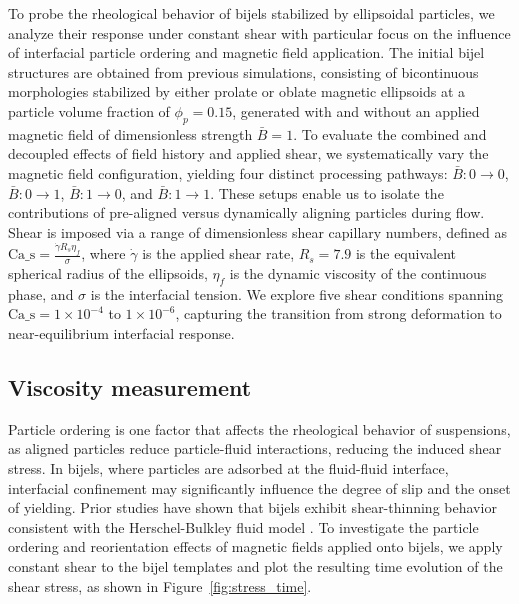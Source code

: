 To probe the rheological behavior of bijels stabilized by ellipsoidal particles, we analyze their response under constant shear with particular focus on the influence of interfacial particle ordering 
and magnetic field application. The initial bijel structures are obtained from previous simulations, consisting of bicontinuous morphologies stabilized by either prolate or oblate magnetic 
ellipsoids at a particle volume fraction of $\phi_p = 0.15$, generated with and without an applied magnetic field of dimensionless strength $\bar{B} = 1$. To evaluate the combined and decoupled effects 
of field history and applied shear, we systematically vary the magnetic field configuration, yielding four distinct processing pathways: 
$\bar{B}:0 \rightarrow 0$, $\bar{B}:0 \rightarrow 1$, $\bar{B}:1 \rightarrow 0$, and $\bar{B}:1 \rightarrow 1$. These setups enable us to isolate the contributions of pre-aligned versus dynamically aligning 
particles during flow. Shear is imposed via a range of dimensionless shear capillary numbers, defined as $\text{Ca_s}  = \frac{\dot{\gamma} R_s \eta_f}{\sigma}$, where $\dot{\gamma}$ is the applied shear rate, 
$R_s = 7.9$ is the equivalent spherical radius of the ellipsoids, $\eta_f$ is the dynamic viscosity of the continuous phase, and $\sigma$ is the interfacial tension. 
\cite{frijters_effects_2012, yang_capillary_2022} We explore five shear conditions spanning $\text{Ca_s} = 1 \times 10^{-4}$ to $1 \times 10^{-6}$, capturing the transition from strong deformation to 
near-equilibrium interfacial response.

\subsection{Viscosity measurement}

Particle ordering is one factor that affects the rheological behavior of suspensions, as aligned particles reduce particle-fluid interactions, reducing the
induced shear stress. In bijels, where particles are adsorbed at the fluid-fluid interface, interfacial confinement may significantly 
influence the degree of slip and the onset of yielding. Prior studies have shown that bijels exhibit shear-thinning behavior consistent 
with the Herschel-Bulkley fluid model \cite{macmillan_rheological_2019}. To investigate the particle ordering and reorientation effects of magnetic fields
applied onto bijels, we apply constant shear to the bijel templates and plot the resulting time evolution of 
the shear stress, as shown in Figure~\ref{fig:stress_time}.

